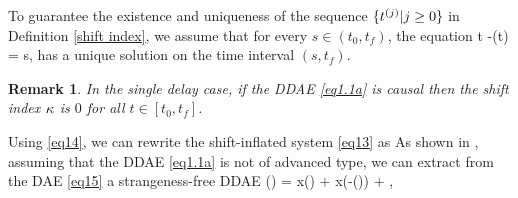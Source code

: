 \documentclass[final,reqno]{siamltex}
\newtheorem{remark}[theorem]{Remark}
\begin{document}
To guarantee the existence and uniqueness of the sequence $\{t^{(j)}| j\geq 0\}$ in Definition \ref{shift index}, we assume that for every $s \in (t_0,t_f)$, the equation
%
\be\label{shift equation}
 t -\tau(t) = s,
\ee
%
has a unique solution on the time interval $(s,t_f)$. 

\begin{remark}
In the single delay case, if the DDAE \eqref{eq1.1a} is causal then the shift index $\kappa$ is $0$ for all $t \in [t_0,t_f]$.
\end{remark}

Using \eqref{eq14}, we can rewrite the shift-inflated system \eqref{eq13} as
%
\be\label{eq15}
\ee
%
As shown in \cite{HaM14}, assuming that the DDAE \eqref{eq1.1a} is not of advanced type, we can extract from the DAE \eqref{eq15} a strangeness-free DDAE 
%
\be\label{eq16}
  () \!=\!  x() \!+\!
  x(-\tau()) \!+\! , \ 
\end{document}
